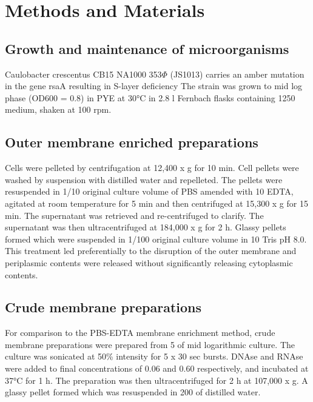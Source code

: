 \section{Methods and Materials}
\label{sec:porin_methods}
\subsection{Growth and maintenance of microorganisms} 
\label{sub:porin_growth}
Caulobacter crescentus CB15 NA1000 353$\Phi$ (JS1013) carries an amber mutation in the gene rsaA resulting in S-layer deficiency The strain was grown to mid log phase (\ac{OD600} = 0.8) in \ac{PYE} at 30\si{\degreeCelsius} in 2.8 \si{\litre} Fernbach flasks containing 1250 \millilitre medium, shaken at 100 rpm.

\subsection{Outer membrane enriched preparations}
\label{sub:porin_omp_prep}
Cells were pelleted by centrifugation at 12,400 x g for 10 min. Cell pellets were washed by suspension with distilled water and repelleted. The pellets were resuspended in 1/10 original culture volume of \ac{PBS} amended with 10 \millimolar{} \ac{EDTA}, agitated at room temperature for 5 min and then centrifuged at 15,300 x g for 15 min. The supernatant was retrieved and re-centrifuged to clarify. The supernatant was then ultracentrifuged at 184,000 x g for 2 h. Glassy pellets formed which were suspended in 1/100 original culture volume in 10 \millimolar Tris pH 8.0. This treatment led preferentially to the disruption of the outer membrane and periplasmic contents were released without significantly releasing cytoplasmic contents.

\subsection{Crude membrane preparations}
\label{sub:porin_crude_preps}
For comparison to the \ac{PBS}-\ac{EDTA} membrane enrichment method, crude membrane preparations were prepared from 5 \millilitre of mid logarithmic culture. The culture was sonicated at 50\% intensity for 5 x 30 sec bursts. DNAse and RNAse were added to final concentrations of 0.06 \mgperml and 0.60 \mgperml respectively, and incubated at 37\si{\degreeCelsius} for 1 h. The preparation was then ultracentrifuged for 2 h at 107,000 x g. A glassy pellet formed which was resuspended in 200 \microlitre of distilled water.

